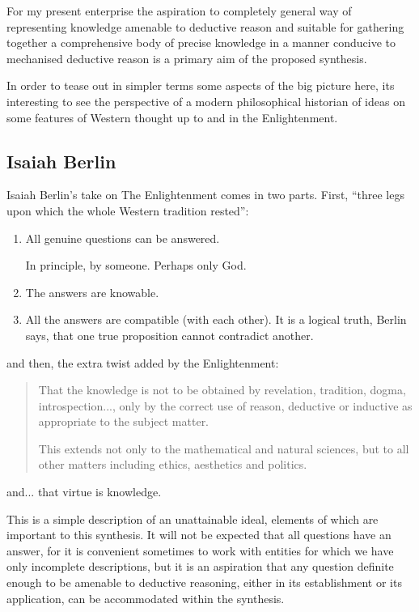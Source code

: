 \documentclass[10pt,titlepage]{book}
\begin{document}
For my present enterprise the aspiration to completely general way of representing knowledge amenable to deductive reason and suitable for gathering together a comprehensive body of precise knowledge in a manner conducive to mechanised deductive reason is a primary aim of the proposed synthesis.

In order to tease out in simpler terms some aspects of the big picture here, its interesting to see the perspective of a modern philosophical historian of ideas on some features of Western thought up to and in the Enlightenment.

\subsection{Isaiah Berlin}

Isaiah Berlin's take on The Enlightenment\cite{berlinRR} comes in two parts.
First, ``three legs upon which the whole Western tradition rested'':
\begin{enumerate}
  \item All genuine questions can be answered.

    In principle, by someone.  Perhaps only God.
\item  The answers are knowable.
\item All the answers are compatible (with each other).
  It is a logical truth, Berlin says, that one true proposition cannot contradict another.
\end{enumerate}

and then, the extra twist added by the Enlightenment:
\begin{quotation}
That the knowledge is not to be obtained by revelation, tradition, dogma, introspection..., only by the correct use of reason, deductive or inductive as appropriate to the subject matter.

This extends not only to the mathematical and natural sciences, but to all other matters including ethics, aesthetics and politics.
\end{quotation}
and... that virtue is knowledge.

This is a simple description of an unattainable ideal, elements of which are important to this synthesis.
It will not be expected that all questions have an answer, for it is convenient sometimes to work with entities for which we have only incomplete descriptions, but it is an aspiration that any question definite enough to be amenable to deductive reasoning, either in its establishment or its application, can be accommodated within the synthesis.
\end{document}
